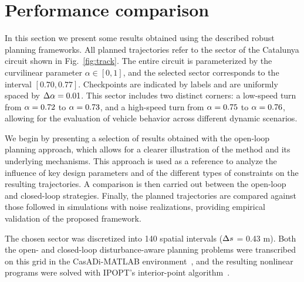 \section{Performance comparison}
\label{sec:performance_comparison}

In this section we present some results obtained using the described robust planning frameworks. All planned trajectories refer to the sector of the Catalunya circuit shown in Fig.~\ref{fig:track}.
The entire circuit is parameterized by the curvilinear parameter $\alpha \in [0,1]$, and the selected sector corresponds to the interval $\left[0.70, 0.77\right]$. Checkpoints are indicated by labels and are uniformly spaced by $\Delta\alpha=0.01$. This sector includes two distinct corners: a low-speed turn from $\alpha = 0.72$ to $\alpha = 0.73$, and a high-speed turn from $\alpha = 0.75$ to $\alpha = 0.76$, allowing for the evaluation of vehicle behavior across different dynamic scenarios.
 
We begin by presenting a selection of results obtained with the open-loop planning approach, which allows for a clearer illustration of the method and its underlying mechanisms. This approach is used as a reference to analyze the influence of key design parameters and of the different types of constraints on the resulting trajectories. A comparison is then carried out between the open-loop and closed-loop strategies. Finally, the planned trajectories are compared against those followed in simulations with noise realizations, providing empirical validation of the proposed framework.

The chosen sector was discretized into 140 spatial intervals ($\Delta s$ = 0.43 m). Both the open- and closed-loop disturbance-aware planning problems were transcribed on this grid in the CasADi-MATLAB environment~\cite{Andersson:MPC:2019}, and the resulting nonlinear programs were solved with IPOPT's interior-point algorithm~\cite{Wachter:MP:2006}.
  


